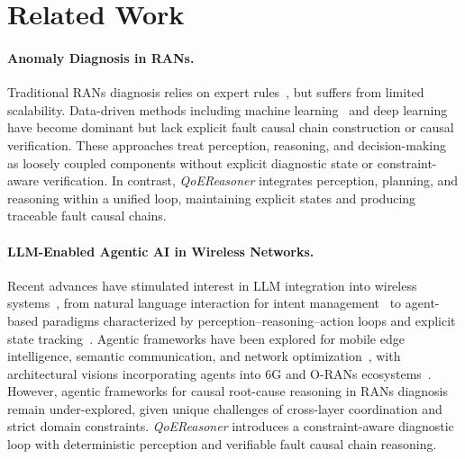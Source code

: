 \documentclass[sigconf,10pt]{acmart} %
\begin{document}
\section{Related Work}
\paragraph{Anomaly Diagnosis in RANs.}
Traditional RANs diagnosis relies on expert rules~\cite{kane2015system}, but suffers from limited scalability. Data-driven methods including machine learning~\cite{sundqvist2020boosted, dimopoulos2015identifying, chen2019machine} and deep learning~\cite{fida2023bottleneck} have become dominant but lack explicit fault causal chain construction or causal verification. These approaches treat perception, reasoning, and decision-making as loosely coupled components without explicit diagnostic state or constraint-aware verification.
In contrast, \textit{QoEReasoner} integrates perception, planning, and reasoning within a unified loop, maintaining explicit states and producing traceable fault causal chains.



\paragraph{LLM-Enabled Agentic AI in Wireless Networks.}
Recent advances have stimulated interest in LLM integration into wireless systems~\cite{boateng2025survey, jiang2024large}, from natural language interaction for intent management~\cite{mekrache2024intent, tong2024connectgpt} to agent-based paradigms characterized by perception–reasoning–action loops and explicit state tracking~\cite{zhang2026toward}.
Agentic frameworks have been explored for mobile edge intelligence, semantic communication, and network optimization~\cite{qu2025mobile, luo2025toward, sun2025edge, tong2025wirelessagent}, with architectural visions incorporating agents into 6G and O-RANs ecosystems~\cite{li2024agent, salama2025edge, jiang2026large, lin2025pushing}.
However, agentic frameworks for causal root-cause reasoning in RANs diagnosis remain under-explored, given unique challenges of cross-layer coordination and strict domain constraints. \textit{QoEReasoner} introduces a constraint-aware diagnostic loop with deterministic perception and verifiable fault causal chain reasoning.
\end{document}
